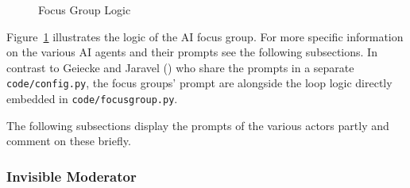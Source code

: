 \documentclass[
  letterpaper,
  DIV=11,
  numbers=noendperiod]{scrartcl}
\begin{document}
\begin{figure}


\caption{\label{fig-logic}Focus Group Logic}

\end{figure}%

Figure~\ref{fig-logic} illustrates the logic of the AI focus group. For
more specific information on the various AI agents and their prompts see
the following subsections. In contrast to Geiecke and Jaravel
() who share the prompts in a
separate \texttt{code/config.py}, the focus groups' prompt are alongside
the loop logic directly embedded in \texttt{code/focusgroup.py}.

The following subsections display the prompts of the various actors
partly and comment on these briefly.

\subsubsection{Invisible
Moderator}\label{sec-focusgroup-aiagents-invisiblemoderator}
\end{document}
